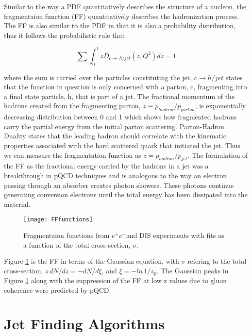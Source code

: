 Similar to the way a PDF quantitatively describes the structure of a nucleon, the fragmentaion function (FF) quantitatively describes the hadronization process.  The FF is also similar to the PDF in that it is also a probability distribution, thus it follows the probabilistic rule that

\begin{equation}
\sum \int_{0}^{1} z D_{c \rightarrow \, h/jet} (z,Q^{2})dz = 1
\label{eq:FFRule}
\end{equation}

\noindent
where the sum is carried over the particles constituting the jet, $c \rightarrow h/jet$ states that the function in question is only concerned with a parton, c, fragmenting into a final state particle, h, that is part of a jet.  The fractional momentum of the hadrons created from the fragmenting parton, $z \equiv p_{hadron} / p_{parton}$, is  exponentially decreasing distribution between 0 and 1 which shows how fragmented hadrons carry the partial energy from the initial parton scattering.  Parton-Hadron Duality\cite{Jenkovszky:2012dc} states that the leading hadron should correlate with the kinematic properties associated with the hard scattered quark that initiated the jet.  Thus we can measure the fragmentation function as $z = p_{hadron} / p_{jet}$.  The formulation of the FF as the fractional energy carried by the hadrons in a jet was a breakthrough in pQCD techniques and is analogous to the way an electron passing through an absorber creates photon showers. These photons continue generating conversion electrons until the total energy has been dissipated into the material.

\begin{figure}[h]
\texttt{[image: FFfunctions]}
\centering
\caption{Fragmentaion functions from $e^{+}e^{-}$and DIS experiments with fits\cite{rak_tannenbaum_2013} as a function of the total cross-section, $\sigma$.}
\label{fig:FFfunc}
\end{figure}


Figure \ref{fig:FFfunc} is the FF in terms of the Gaussian equation, with $\sigma$ refering to the total cross-section, $z \, dN/dz = - dN /d \xi $, and $\xi = -ln  \,1/z_{p}$. The Gaussian peaks in Figure \ref{fig:FFfunc} along with the suppression of the FF at low z values due to gluon coherence were predicted by pQCD. 

\section{Jet Finding Algorithms}

